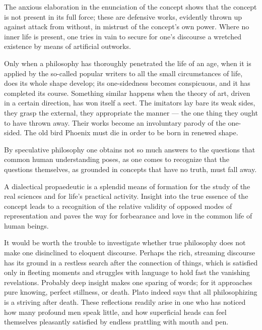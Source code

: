 \documentclass[12pt,a4paper]{article}
\newcommand{\opage}[1]{\marginnote{\footnotesize\textit{[#1]}}}
\newcommand{\aphsep}{\par\smallskip\centerline{\textasteriskcentered}\smallskip}
\begin{document}
\aphsep

The anxious elaboration in the enunciation of the concept shows that the concept
is not present in its full force; these are defensive works, evidently thrown up
against attack from without, in mistrust of the concept's own power. Where no
inner life is present, one tries in vain to secure for one's discourse a wretched
existence by means of artificial outworks.

\aphsep

Only when a philosophy has thoroughly penetrated the life of an age, when it is
applied by the so-called popular writers \opage{29}to all the small circumstances
of life, does its whole shape develop; its one-sidedness becomes conspicuous, and
it has completed its course. Something similar happens when the theory of art,
driven in a certain direction, has won itself a sect. The imitators lay bare its
weak sides, they grasp the external, they appropriate the manner --- the one
thing they ought to have thrown away. Their works become an involuntary parody of
the one-sided. The old bird Phoenix must die in order to be born in renewed
shape.

\aphsep

By speculative philosophy one obtains not so much answers to the questions that
common human understanding poses, as one comes to recognize that the questions
themselves, as grounded in concepts that have no truth, must fall away.

\aphsep

A dialectical propaedeutic is a splendid means of formation for the study of the
real sciences and for life's practical activity. Insight into the true essence of
the concept leads to a recognition of the relative validity of opposed modes of
representation and paves the way for forbearance and love in the common life of
human beings.

\aphsep

It would be worth the trouble to investigate whether true philosophy does not
make one disinclined to eloquent discourse. Perhaps the rich, streaming discourse
has its ground in a restless search after the connection of things, which is
satisfied only in fleeting moments and struggles with language to hold fast the
vanishing revelations. Probably deep insight makes one sparing of words; for it
approaches pure knowing, perfect stillness, or death. Plato indeed says that all
philosophizing is a striving \opage{30}after death. These reflections readily
arise in one who has noticed how many profound men speak little, and how
superficial heads can feel themselves pleasantly satisfied by endless prattling
with mouth and pen.
\end{document}
